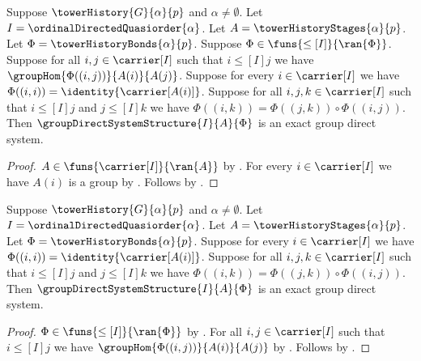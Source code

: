\begin{theorem}\label{tower_history_system_after_group_family}
    Suppose $\towerHistory{G}{\alpha}{p}$ and
        $\alpha\neq\emptyset$.
    Let $I=\ordinalDirectedQuasiorder{\alpha}$.
    Let $A=\towerHistoryStages{\alpha}{p}$.
    Let $\Phi=\towerHistoryBonds{\alpha}{p}$.
    Suppose $\Phi\in\funs{\leq[I]}{\ran{\Phi}}$.
    Suppose for all $i,j\in\carrier[I]$ such that
        $i\mathrel{\leq[I]}j$ we have
        $\groupHom{\Phi((i,j))}{A(i)}{A(j)}$.
    Suppose for every $i\in\carrier[I]$ we have
        $\Phi((i,i))=\identity{\carrier[A(i)]}$.
    Suppose for all $i,j,k\in\carrier[I]$ such that
        $i\mathrel{\leq[I]}j$ and $j\mathrel{\leq[I]}k$ we have
        $\Phi((i,k))=\Phi((j,k))\circ\Phi((i,j))$.
    Then $\groupDirectSystemStructure{I}{A}{\Phi}$ is an exact
        group direct system.
\end{theorem}
\begin{proof}
    $A\in\funs{\carrier[I]}{\ran{A}}$ by
        .
    For every $i\in\carrier[I]$ we have $A(i)$ is a group by
        .
    Follows by .
\end{proof}

\begin{theorem}\label{tower_history_system_after_bond_homs}
    Suppose $\towerHistory{G}{\alpha}{p}$ and
        $\alpha\neq\emptyset$.
    Let $I=\ordinalDirectedQuasiorder{\alpha}$.
    Let $A=\towerHistoryStages{\alpha}{p}$.
    Let $\Phi=\towerHistoryBonds{\alpha}{p}$.
    Suppose for every $i\in\carrier[I]$ we have
        $\Phi((i,i))=\identity{\carrier[A(i)]}$.
    Suppose for all $i,j,k\in\carrier[I]$ such that
        $i\mathrel{\leq[I]}j$ and $j\mathrel{\leq[I]}k$ we have
        $\Phi((i,k))=\Phi((j,k))\circ\Phi((i,j))$.
    Then $\groupDirectSystemStructure{I}{A}{\Phi}$ is an exact
        group direct system.
\end{theorem}
\begin{proof}
    $\Phi\in\funs{\leq[I]}{\ran{\Phi}}$ by
        .
    For all $i,j\in\carrier[I]$ such that
        $i\mathrel{\leq[I]}j$ we have
        $\groupHom{\Phi((i,j))}{A(i)}{A(j)}$ by
        .
    Follows by .
\end{proof}

